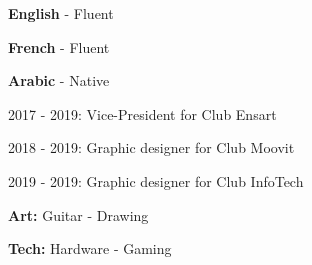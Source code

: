 \documentclass[10pt]{developercv} %
\begin{document}
\begin{minipage}[t]{0.2\textwidth}
	\vspace{-\baselineskip} %

	
	\textbf{English} - Fluent

	\textbf{French} - Fluent

	\textbf{Arabic} - Native
\end{minipage}
\hfill
\begin{minipage}[t]{0.5\textwidth}
	\vspace{-\baselineskip} %


    {2017 - 2019: Vice-President for Club Ensart}

	{2018 - 2019: Graphic designer for Club Moovit}
    
    {2019 - 2019: Graphic designer for Club InfoTech}

\end{minipage}
\hfill
\begin{minipage}[t]{0.2\textwidth}
	\vspace{-\baselineskip} %

	
	\textbf{Art:}
	{\newline Guitar  - Drawing}

    \textbf{Tech:}
    {\newline Hardware - Gaming}

\end{minipage}
\end{document}
